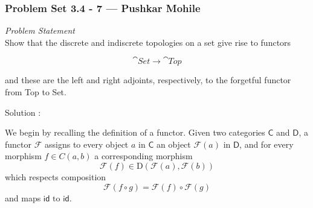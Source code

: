 
\begin{frame}
    \frametitle{Problem Set 3.4 - 7 --- Pushkar Mohile}
    \emph{Problem Statement}\\
    Show that the discrete and indiscrete topologies on a
    set give rise to functors

\begin{equation*}
    \cat{Set}\to \cat{Top}
\end{equation*}    
    
    and these are the left and right adjoints, respectively, to the forgetful
    functor from Top to Set. 
\end{frame}
\begin{frame}
    
Solution : 

We begin by recalling the definition of a functor. Given two categories
\(\textsf{C}\) and \(\textsf{D}\), a functor \(\mathcal{F} \) assigns to every
object \(a \text{ in } \textsf{C}\) an object \(\mathcal{F}(a)\text{ in }\textsf{D}\), and for
every morphism \(f \in C(a,b)\) a corresponding morphism 
\begin{equation}
\mathcal{F}(f) \in \text{D}(\mathcal{F}(a), \mathcal{F}(b) )
\end{equation}
which respects composition 
\begin{equation}
    \mathcal{F}(f\circ g) = \mathcal{F}(f) \circ \mathcal{F}(g)
\end{equation}
    and maps \(\textsf{id} \text{ to } \textsf{id}\).

    \begin{center}
    \end{center}

\end{frame}

